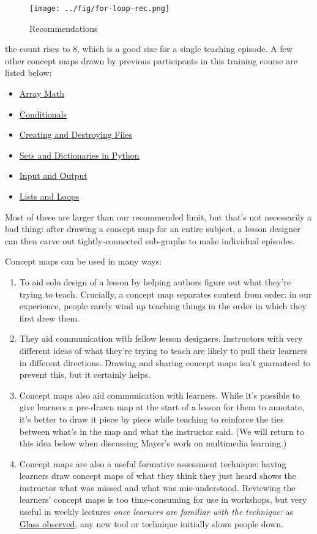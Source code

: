 \begin{figure}[htbp]
\centering
\texttt{[image: ../fig/for-loop-rec.png]}
\caption{Recommendations}
\end{figure}

the count rises to 8, which is a good size for a single teaching
episode. A few other concept maps drawn by previous participants in this
training course are listed below:

\begin{itemize}
\item
  \href{../fig/array-math.png}{Array Math}
\item
  \href{../fig/conditionals.png}{Conditionals}
\item
  \href{../fig/create-destroy.png}{Creating and Destroying Files}
\item
  \href{../fig/dict-set.png}{Sets and Dictionaries in Python}
\item
  \href{../fig/io.png}{Input and Output}
\item
  \href{../fig/lists-loops.png}{Lists and Loops}
\end{itemize}

Most of these are larger than our recommended limit, but that's not
necessarily a bad thing: after drawing a concept map for an entire
subject, a lesson designer can then carve out tightly-connected
sub-graphs to make individual episodes.

Concept maps can be used in many ways:

\begin{enumerate}
\item
  To aid solo design of a lesson by helping authors figure out what
  they're trying to teach. Crucially, a concept map separates content
  from order: in our experience, people rarely wind up teaching things
  in the order in which they first drew them.
\item
  They aid communication with fellow lesson designers. Instructors with
  very different ideas of what they're trying to teach are likely to
  pull their learners in different directions. Drawing and sharing
  concept maps isn't guaranteed to prevent this, but it certainly helps.
\item
  Concept maps also aid communication with learners. While it's possible
  to give learners a pre-drawn map at the start of a lesson for them to
  annotate, it's better to draw it piece by piece while teaching to
  reinforce the ties between what's in the map and what the instructor
  said. (We will return to this idea below when discussing Mayer's work
  on multimedia learning.)
\item
  Concept maps are also a useful formative assessment technique: having
  learners draw concept maps of what they think they just heard shows
  the instructor what was missed and what was mis-understood. Reviewing
  the learners' concept maps is too time-consuming for use in workshops,
  but very useful in weekly lectures \emph{once learners are familiar
  with the technique}: as
  \href{http://www.amazon.com/Facts-Fallacies-Software-Engineering-Robert/dp/0321117425/}{Glass
  observed}, any new tool or technique initially slows people down.
\end{enumerate}

